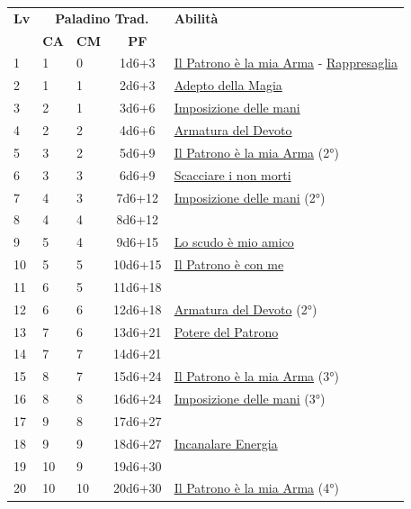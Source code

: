 {\begin{multicols}{2}

\noindent\begin{tabularx}{\linewidth}{p{0.3cm}|p{0.3cm}p{0.3cm}c|X|}
	\toprule
 \rowcolor{gray!20}	\textbf{Lv} & \multicolumn{3}{c|}{\textbf{Paladino Trad.}} & \textbf{Abilità} \\
& \centering\arraybackslash \textbf{CA} & \centering\arraybackslash \textbf{CM} & \centering\arraybackslash \textbf{PF} & \\
	\toprule
	1 &1	& 0	&	1d6+3	&\hyperlink{Il Patrono è la mia Arma}{Il Patrono è la mia Arma} - \hyperlink{Rappresaglia}{Rappresaglia}\\
 \rowcolor{gray!20}2	&	1	& 1	&	2d6+3	&\hyperlink{Adepto della Magia}{Adepto della Magia}\\
	3	&	2	& 1	&	3d6+6	&\hyperlink{Imposizione delle mani}{Imposizione delle mani}\\
 \rowcolor{gray!20}4	&	2	& 2	&	4d6+6	&\hyperlink{Armatura del Devoto}{Armatura del Devoto}\\
	5	&	3	& 2	&	5d6+9	&\hyperlink{Il Patrono è la mia Arma}{Il Patrono è la mia Arma} (2°)\\
 \rowcolor{gray!20}6	&	3	& 3	&	6d6+9	&\hyperlink{Scacciare i non morti}{Scacciare i non morti}\\
	7	&	4	& 3	&	7d6+12	&\hyperlink{Imposizione delle mani}{Imposizione delle mani} (2°)\\
 \rowcolor{gray!20}8	&	4	& 4	&	8d6+12	&\\
	9	&	5	& 4	&	9d6+15	&\hyperlink{Lo scudo è mio amico}{Lo scudo è mio amico}\\
 \rowcolor{gray!20}10	&	5	& 5	&	10d6+15	&\hyperlink{Il Patrono è con me}{Il Patrono è con me}\\
	11	&	6	& 5	&	11d6+18	&\\
 \rowcolor{gray!20}12	&	6	& 6	&	12d6+18	&\hyperlink{Armatura del Devoto}{Armatura del Devoto} (2°)\\
	13	&	7	& 6	&	13d6+21	&\hyperlink{Potere del Patrono}{Potere del Patrono}\\
 \rowcolor{gray!20}14	&	7	& 7	&	14d6+21	&\\
	15	&	8	& 7	&	15d6+24	&\hyperlink{Il Patrono è la mia Arma}{Il Patrono è la mia Arma} (3°)\\
 \rowcolor{gray!20}16	&	8	& 8	&	16d6+24	&\hyperlink{Imposizione delle mani}{Imposizione delle mani} (3°)\\
	17	&	9	& 8	&	17d6+27	&\\
 \rowcolor{gray!20}18	&	9	& 9	&	18d6+27	&\hyperlink{Incanalare Energia}{Incanalare Energia}\\
	19	&	10	& 9	&	19d6+30	&\\
 \rowcolor{gray!20}20	&	10	& 10	&	20d6+30	&\hyperlink{Il Patrono è la mia Arma}{Il Patrono è la mia Arma} (4°)\\
\end{tabularx}


\end{multicols}}
